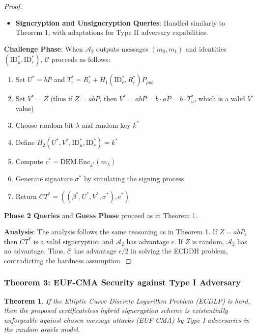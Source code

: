 \documentclass[10pt]{article}
\newtheorem{theorem}{Theorem}
\newtheorem{proof}{Proof}
\begin{document}
\begin{proof}
\begin{itemize}
    \item \textbf{Signcryption and Unsigncryption Queries}: Handled similarly to Theorem 1, with adaptations for Type II adversary capabilities.
\end{itemize}

\textbf{Challenge Phase}:
When $\mathcal{A}_2$ outputs messages $(m_0, m_1)$ and identities $(\text{ID}_u^*, \text{ID}_r^*)$, $\mathcal{C}$ proceeds as follows:
\begin{enumerate}
    \item Set $U^* = bP$ and $T_r^* = R_r^* + H_1(\text{ID}_r^*, R_r^*)P_{pub}$
    \item Set $V^* = Z$ (thus if $Z = abP$, then $V^* = abP = b \cdot aP = b \cdot T_u^*$, which is a valid $V$ value)
    \item Choose random bit $\lambda$ and random key $k^*$
    \item Define $H_2(U^*, V^*, \text{ID}_u^*, \text{ID}_r^*) = k^*$
    \item Compute $c^* = \text{DEM.Enc}_{k^*}(m_\lambda)$
    \item Generate signature $\sigma^*$ by simulating the signing process
    \item Return $CT^* = ((\beta^*, U^*, V^*, \sigma^*), c^*)$
\end{enumerate}

\textbf{Phase 2 Queries} and \textbf{Guess Phase} proceed as in Theorem 1.

\textbf{Analysis}:
The analysis follows the same reasoning as in Theorem 1. If $Z = abP$, then $CT^*$ is a valid signcryption and $\mathcal{A}_2$ has advantage $\epsilon$. If $Z$ is random, $\mathcal{A}_2$ has no advantage. Thus, $\mathcal{C}$ has advantage $\epsilon/2$ in solving the ECDDH problem, contradicting the hardness assumption.
\end{proof}

\subsubsection{Theorem 3: EUF-CMA Security against Type I Adversary}

\begin{theorem}
If the Elliptic Curve Discrete Logarithm Problem (ECDLP) is hard, then the proposed certificateless hybrid signcryption scheme is existentially unforgeable against chosen message attacks (EUF-CMA) by Type I adversaries in the random oracle model.
\end{theorem}
\end{document}
